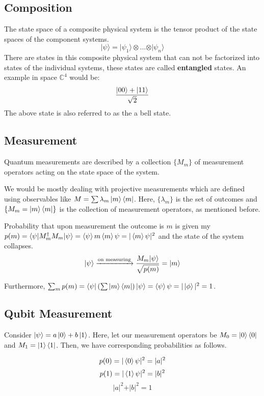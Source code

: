 \documentclass[11.5pt, paper=a4]{article}
\theoremstyle{definition}
\numberwithin{theorem}{section}
\begin{document}
\subsection{Composition}
The state space of a composite physical system is the tensor product of the state spaces of the component systems.
$$
\vert\psi\rangle = \vert\psi_1\rangle\otimes...\otimes\vert\psi_n\rangle
$$
There are states in this composite physical system that can not be factorized into states of the individual systems, these states are called \textbf{entangled} states. An example in space $\mathbb{C}^4$ would be:
\begin{equation*}
    \frac{\ket{00} + \ket{11}}{\sqrt{2}}
\end{equation*}
The above state is also referred to as the a bell state.

\subsection{Measurement}
Quantum measurements are described by a collection $\{M_m\}$ of measurement operators acting on the state space of the system. \newline

We would be mostly dealing with projective measurements which are defined using observables like $M = \sum \lambda_m \ket{m}\bra{m}$. Here, $\{\lambda_m\}$ is the set of outcomes and $\{M_m = \ket{m}\bra{m}\}$ is the collection of measurement operators, as mentioned before.\newline

Probability that upon measurement the outcome is $m$ is given my $p(m) = \langle\psi\vert M_m^\dagger M_m\vert\psi\rangle = \braket{\psi}{m}\braket{m}{\psi} = \vert\braket{m}{\psi}\vert^2$ and the state of the system collapses.
$$
\vert\psi\rangle \xrightarrow{\text{on measuring}} \frac{M_m\vert\psi\rangle}{\sqrt{p(m)}} = \ket{m}
$$

Furthermore, $\sum_m p(m) = \bra{\psi} (\sum \ket{m}\bra{m}) \ket{\psi} = \braket{\psi}{\psi} = \vert \ket{\phi} \vert^2 = 1$.

\subsection{Qubit Measurement}
Consider $\ket{\psi} = a \ket{0} + b \ket{1}$. Here, let our measurement operators be $M_0 = \ket{0}\bra{0}$ and $M_1 = \ket{1}\bra{1}$. Then, we have corresponding probabilities as follows.

$$p(0) = \vert \braket{0}{\psi} \vert^2 = \vert a \vert^2$$
$$p(1) = \vert \braket{1}{\psi} \vert^2 = \vert b \vert^2$$
$$\vert a\vert^2 + \vert b \vert^2 = 1$$
\end{document}

